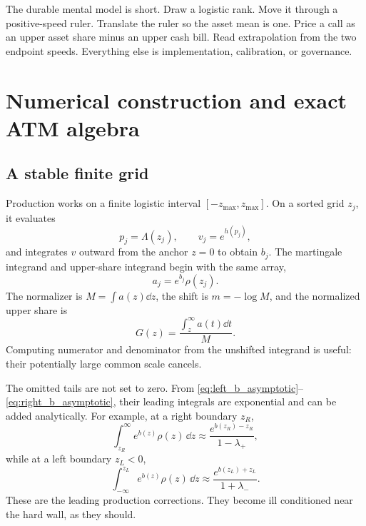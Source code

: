 \documentclass[11pt]{article}
\begin{document}
\begin{invariant}
The durable mental model is short.  Draw a logistic rank.  Move it through a
positive-speed ruler.  Translate the ruler so the asset mean is one.  Price a
call as an upper asset share minus an upper cash bill.  Read extrapolation from
the two endpoint speeds.  Everything else is implementation, calibration, or
governance.
\end{invariant}


\appendix

\section{Numerical construction and exact ATM algebra}
\label{app:numerics}

\subsection{A stable finite grid}

Production works on a finite logistic interval $[-z_{\max},z_{\max}]$.  On a
sorted grid $z_j$, it evaluates
\[
p_j=\Lambda(z_j),\qquad v_j=e^{h(p_j)},
\]
and integrates $v$ outward from the anchor $z=0$ to obtain $b_j$.  The
martingale integrand and upper-share integrand begin with the same array,
\[
a_j=e^{b_j}\rho(z_j).
\]
The normalizer is $M=\int a(z)\dd z$, the shift is $m=-\log M$, and the
normalized upper share is
\begin{equation}
G(z)=\frac{\int_z^\infty a(t)\dd t}{M}.
\label{eq:numerical_share}
\end{equation}
Computing numerator and denominator from the unshifted integrand is useful:
their potentially large common scale cancels.

The omitted tails are not set to zero.  From
\eqref{eq:left_b_asymptotic}--\eqref{eq:right_b_asymptotic}, their leading
integrals are exponential and can be added analytically.  For example, at a
right boundary $z_R$,
\begin{equation}
\int_{z_R}^\infty e^{b(z)}\rho(z)\,\dd z
\approx
\frac{e^{b(z_R)-z_R}}{1-\lambda_+},
\label{eq:right_tail_correction}
\end{equation}
while at a left boundary $z_L<0$,
\begin{equation}
\int_{-\infty}^{z_L} e^{b(z)}\rho(z)\,\dd z
\approx
\frac{e^{b(z_L)+z_L}}{1+\lambda_-}.
\label{eq:left_tail_correction}
\end{equation}
These are the leading production corrections.  They become ill conditioned
near the hard wall, as they should.
\end{document}
